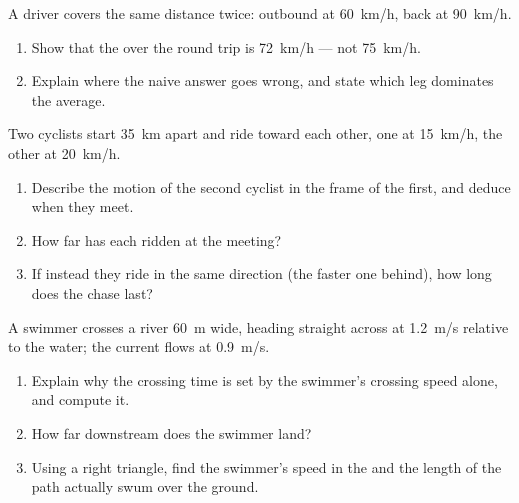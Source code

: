\begin{exercise}[$\star\star\star$]\label{exo:g10:relative-motion:12}
A driver covers the same distance twice: outbound at \qty{60}{km/h},
back at \qty{90}{km/h}.
\begin{enumerate}
  \item Show that the  over the round trip is
        \qty{72}{km/h} --- not \qty{75}{km/h}.
  \item Explain where the naive answer goes wrong, and state which leg
        dominates the average.
\end{enumerate}
\end{exercise}

\begin{exercise}[$\star\star\star$]\label{exo:g10:relative-motion:13}
Two cyclists start \qty{35}{km} apart and ride toward each other, one at
\qty{15}{km/h}, the other at \qty{20}{km/h}.
\begin{enumerate}
  \item Describe the motion of the second cyclist in the frame of the
        first, and deduce when they meet.
  \item How far has each ridden at the meeting?
  \item If instead they ride in the same direction (the faster one
        behind), how long does the chase last?
\end{enumerate}
\end{exercise}

\begin{exercise}[$\star\star\star$]\label{exo:g10:relative-motion:14}
A swimmer crosses a river \qty{60}{m} wide, heading straight across at
\qty{1.2}{m/s} relative to the water; the current flows at
\qty{0.9}{m/s}.
\begin{enumerate}
  \item Explain why the crossing time is set by the swimmer's crossing
        speed alone, and compute it.
  \item How far downstream does the swimmer land?
  \item Using a right triangle, find the swimmer's speed in the  and the length of the path actually swum over the ground.
\end{enumerate}
\end{exercise}

